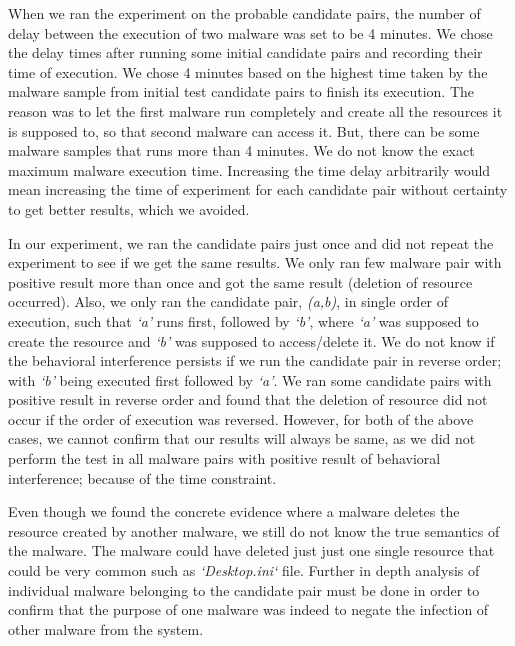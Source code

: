 When we ran the experiment on the probable candidate pairs, the number of delay between the execution of two malware was set to be 4 minutes.
We chose the delay times after running some initial candidate pairs and recording their time of execution.
We chose 4 minutes based on the highest time taken by the malware sample from initial test candidate pairs to finish its execution.
The reason was to let the first malware run completely and create all the resources it is supposed to, so that second malware can access it.
But, there can be some malware samples that runs more than 4 minutes.
We do not know the exact maximum malware execution time.
Increasing the time delay arbitrarily would mean increasing the time of experiment for each candidate pair without certainty to get better results, which we avoided.

In our experiment, we ran the candidate pairs just once and did not repeat the experiment to see if we get the same results.
We only ran few malware pair with positive result more than once and got the same result (deletion of resource occurred).
Also, we only ran the candidate pair, \emph{(a,b)}, in single order of execution, such that \emph{`a'} runs first, followed by \emph{`b'}, where \emph{`a'} was supposed to create the resource and \emph{`b'} was supposed to access/delete it.
We do not know if the behavioral interference persists if we run the candidate pair in reverse order; with \emph{`b'} being executed first followed by \emph{`a'}.
We ran some candidate pairs with positive result in reverse order and found that the deletion of resource did not occur if the order of execution was reversed.
However, for both of the above cases, we cannot confirm that our results will always be same, as we did not perform the test in all malware pairs with positive result of behavioral interference; because of the time constraint.

Even though we found the concrete evidence where a malware deletes the resource created by another malware, we still do not know the true semantics of the malware.
The malware could have deleted just just one single resource that could be very common such as \emph{`Desktop.ini`} file.
Further in depth analysis of individual malware belonging to the candidate pair must be done in order to confirm that the purpose of one malware was indeed to negate the infection of other malware from the system.
